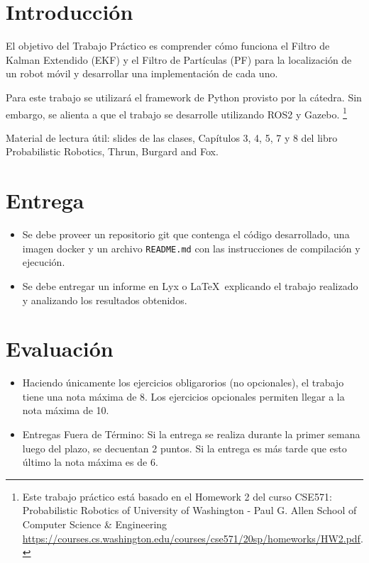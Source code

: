 \documentclass[tp]{lcc}
\begin{document}
	\maketitle
	
	
	\section{Introducción}
	
	El objetivo del Trabajo Práctico es comprender cómo funciona el Filtro de Kalman Extendido (EKF) y el Filtro de Partículas (PF) para la localización de un robot móvil y desarrollar una implementación de cada uno.
	
	Para este trabajo se utilizará el framework de Python provisto por la cátedra. Sin embargo, se alienta a que el trabajo se desarrolle utilizando ROS2 y Gazebo. \footnote{Este trabajo práctico está basado en el Homework 2 del curso CSE571: Probabilistic Robotics of University of Washington - Paul G. Allen School of Computer Science \& Engineering \url{https://courses.cs.washington.edu/courses/cse571/20sp/homeworks/HW2.pdf}.}
	
	Material de lectura útil: slides de las clases, Capítulos 3, 4, 5, 7 y 8 del libro Probabilistic Robotics, Thrun, Burgard and Fox.
	
	
	\section{Entrega}
	\begin{itemize}
		\item Se debe proveer un repositorio git que contenga el código desarrollado, una imagen docker y un archivo \lstinline{README.md} con las instrucciones de compilación y ejecución.
		
		\item Se debe entregar un informe en Lyx o \LaTeX\  explicando el trabajo realizado y analizando los resultados obtenidos.
	\end{itemize}

	\section{Evaluación}
	\begin{itemize}
		\item Haciendo únicamente los ejercicios obligarorios (no opcionales), el trabajo tiene una nota máxima de 8. Los ejercicios opcionales permiten llegar a la nota máxima de 10.
		\item Entregas Fuera de Término: Si la entrega se realiza durante la primer semana luego del plazo, se decuentan 2 puntos. Si la entrega es más tarde que esto último la nota máxima es de 6.
	\end{itemize}
\end{document}
